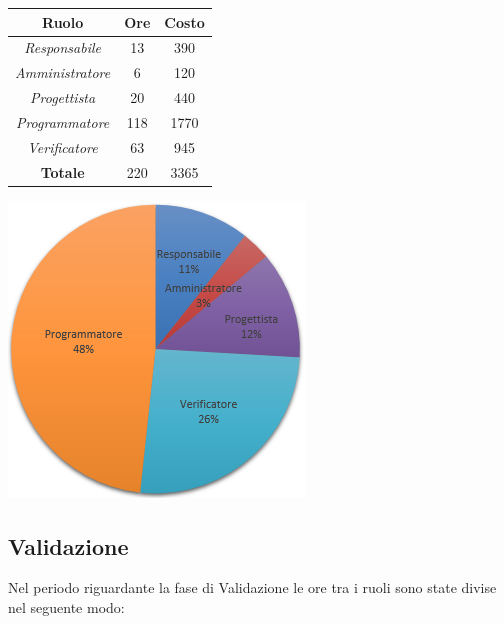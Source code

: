 \begin{center}
  \centering
  \begin{tabular}{|c|c|c|}
    \hline
    \textbf{Ruolo} & \textbf{Ore} & \textbf{Costo} \\
    \hline
     \emph{Responsabile}  & 13 & 390 \\
    \hline  \emph{Amministratore}  & 6 & 120 \\
    \hline  \emph{Progettista}  & 20 & 440 \\
    \hline  \emph{Programmatore}  & 118 & 1770 \\
    \hline  \emph{Verificatore}  & 63 & 945 \\
    \hline
    \textbf{Totale} & 220 & 3365 \\
    \hline
  \end{tabular}
  \includegraphics[scale=0.7]{img/5-Codifica.png}
\end{center}

\subsection{Validazione}
Nel periodo riguardante la fase di Validazione le ore tra i ruoli sono state divise nel seguente modo: \\ \\

